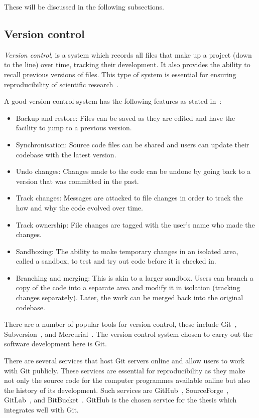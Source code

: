 These will be discussed in the following subsections.

\subsection{Version control}

\textit{Version control}, is a system which records all files that make up a
project (down to the line) over time, tracking their development. It also
provides the ability to recall previous versions of files. This type of system
is essential for ensuring reproducibility of scientific research~\cite{Sandve2013,
Wilson2014}.

A good version control system has the following features as stated in~\cite{Ruparelia2010}:

\begin{itemize}
    \item Backup and restore: Files can be saved as they are edited and have the facility to
    jump to a previous version.
    \item Synchronisation: Source code files can be shared and users can update their
    codebase with the latest version.
    \item Undo changes: Changes made to the code can be undone by going back
    to a version that was committed in the past.
    \item Track changes: Messages are attacked to file changes in order to track the
    how and why the code evolved over time.
    \item Track ownership: File changes are tagged with the user's name who made
    the changes.
    \item Sandboxing: The ability to make temporary changes in an isolated area,
    called a sandbox, to test and try out code before it is checked in.
    \item Branching and merging: This is akin to a larger sandbox. Users can
    branch a copy of the code into a separate area and modify it in
    isolation (tracking changes separately). Later, the work can be merged back
    into the original codebase.
\end{itemize}

There are a number of popular tools for version control, these include Git~\cite{git},
Subversion~\cite{subversion}, and Mercurial~\cite{mercurial}. The version
control system chosen to carry out the software development here is Git.

There are several services that host Git servers online and allow users to work
with Git publicly. These services are essential for reproducibility as they make
not only the source code for the computer programmes available online but also
the history of its development. Such services are GitHub~\cite{github},
SourceForge~\cite{sourceforge}, GitLab~\cite{gitlab}, and BitBucket~\cite{bitbucket}.
GitHub is the chosen service for the thesis which integrates well with Git.

